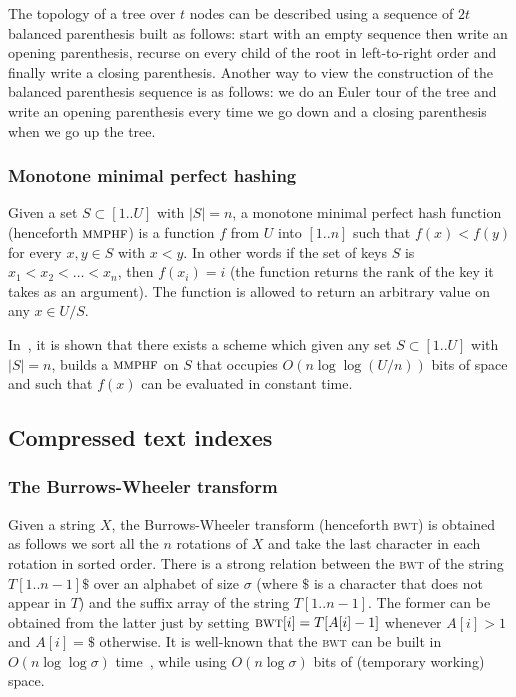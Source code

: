 \documentclass[a4paper]{article}
\begin{document}
The topology of a tree over $t$ nodes can be described using a sequence 
of $2t$ balanced parenthesis built as follows: start 
with an empty sequence then write an opening parenthesis, 
recurse on every child of the root in left-to-right order 
and finally write a closing parenthesis. Another way to view 
the construction of the balanced parenthesis sequence is as 
follows: we do an Euler tour of the tree and write an opening 
parenthesis every time we go down and a closing parenthesis 
when we go up the tree. 

\subsubsection{Monotone minimal perfect hashing}
Given a set $S\subset[1..U]$ with $|S|=n$, a 
monotone minimal perfect hash function (henceforth $\textsc{mmphf}$)
is a function $f$ from $U$ into $[1..n]$ such that $f(x)<f(y)$
for every $x,y\in S$ with $x<y$. In other words 
if the set of keys $S$ is $x_1<x_2<\ldots <x_n$, 
then $f(x_i)=i$ (the function returns the rank 
of the key it takes as an argument).  
The function is allowed 
to return an arbitrary value on any $x\in U/S$. 

In~\cite{BBPV09}, it is shown that there exists a scheme which given 
any set $S\subset[1..U]$ with $|S|=n$, builds 
a $\textsc{mmphf}$ on $S$ that occupies $O(n\log\log(U/n))$
bits of space and such that $f(x)$ can be evaluated in constant time. 



\subsection{Compressed text indexes}
\label{sec:compressed_text_idx}
\subsubsection{The Burrows-Wheeler transform}
Given a string $X$, the Burrows-Wheeler transform (henceforth \textsc{bwt}) is obtained as follows
we sort all the $n$ rotations of $X$ and take the last character in each rotation in sorted order. 
There is a strong relation between the \textsc{bwt} of the string $T[1..n-1]\$$ over an alphabet of size $\sigma$ (where $\$$ is a character that does not appear in $T$) and the suffix array of the string $T[1..n-1]$. The former can be obtained from the latter just by setting $\textsc{bwt}[i]=T[A[i]-1]$ whenever $A[i]>1$ and $A[i]=\$$ otherwise. 
It is well-known that the \textsc{bwt} can be built in $O(n\log\log\sigma)$ time~\cite{HSS09}, while using $O(n\log\sigma)$ bits of (temporary working) space. 
\end{document}
